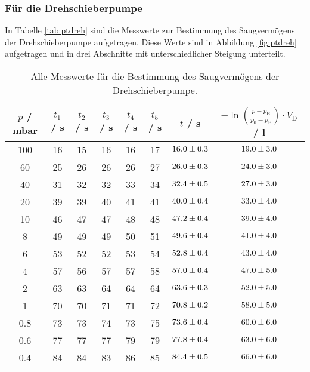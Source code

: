 \subsubsection{Für die Drehschieberpumpe}
In Tabelle \eqref{tab:ptdreh} sind die Messwerte zur Bestimmung des Saugvermögens der Drehschieberpumpe aufgetragen. Diese Werte sind in Abbildung \eqref{fig:ptdreh} aufgetragen und in drei Abschnitte mit unterschiedlicher Steigung unterteilt.

\begin{table} %
  \centering
  \caption{Alle Messwerte für die Bestimmung des Saugvermögens der Drehschieberpumpe.}
  \label{tab:ptDreh}
  \begin{tabular}{c|c|c|c|c|c|c|c}
    $p$ / mbar & $t_1$ / s & $t_2$ / s & $t_3$ / s & $t_4$ / s & $t_5$ / s & $\overline{t}$ / s & $-\ln\left( \frac{p-p_\text{E}}{p_0-p_\text{E}} \right) \cdot V_\text{D}$ / l \\
    \hline
    100  & 16  & 15  & 16  & 16  & 17  & $\num{16.0 +- 0.3}$ & $\num{19.0 +- 3.0}$ \\
    60   & 25  & 26  & 26  & 26  & 27  & $\num{26.0 +- 0.3}$ & $\num{24.0 +- 3.0}$ \\
    40   & 31  & 32  & 32  & 33  & 34  & $\num{32.4 +- 0.5}$ & $\num{27.0 +- 3.0}$ \\
    \hline
    20   & 39  & 39  & 40  & 41  & 41  & $\num{40.0 +- 0.4}$ & $\num{33.0 +- 4.0}$ \\
    10   & 46  & 47  & 47  & 48  & 48  & $\num{47.2 +- 0.4}$ & $\num{39.0 +- 4.0}$ \\
    8    & 49  & 49  & 49  & 50  & 51  & $\num{49.6 +- 0.4}$ & $\num{41.0 +- 4.0}$ \\
    6    & 53  & 52  & 52  & 53  & 54  & $\num{52.8 +- 0.4}$ & $\num{43.0 +- 4.0}$ \\
    4    & 57  & 56  & 57  & 57  & 58  & $\num{57.0 +- 0.4}$ & $\num{47.0 +- 5.0}$ \\
    2    & 63  & 63  & 64  & 64  & 64  & $\num{63.6 +- 0.3}$ & $\num{52.0 +- 5.0}$ \\
    \hline
    1    & 70  & 70  & 71  & 71  & 72  & $\num{70.8 +- 0.2}$ & $\num{58.0 +- 5.0}$ \\
    0.8  & 73  & 73  & 74  & 73  & 75  & $\num{73.6 +- 0.4}$ & $\num{60.0 +- 6.0}$ \\
    0.6  & 77  & 77  & 77  & 79  & 79  & $\num{77.8 +- 0.4}$ & $\num{63.0 +- 6.0}$ \\
    0.4  & 84  & 84  & 83  & 86  & 85  & $\num{84.4 +- 0.5}$ & $\num{66.0 +- 6.0}$ \\

\end{tabular}
\end{table}
